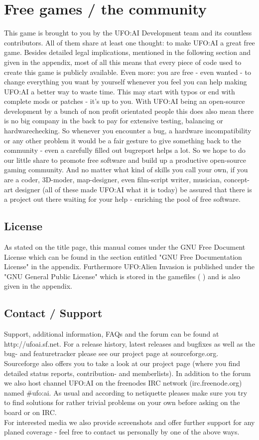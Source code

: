 \section{Free games / the community}
This game is brought to you by the UFO:AI Development team and its countless contributors. All of them share at least one thought: to make UFO:AI a great free %
 game. Besides detailed legal implications, mentioned in the following section and given in the appendix, most of all this means that every piece of code used to create this game is publicly available. Even more: you are free - even wanted - to change everything you want by yourself whenever you feel you can help making UFO:AI a better way to waste time. This may start with typos or end with complete mods or patches - it's up to you. With UFO:AI being an open-source development by a bunch of non profit orientated people this does also mean there is no big company in the back to pay for extensive testing, balancing or hardwarechecking. So whenever you encounter a bug, a hardware incompatibility or any other problem it would be a fair gesture to give something back to the community - even a carefully filled out bugreport helps a lot. So we hope to do our little share to promote free software and build up a productive open-source gaming community. And no matter what kind of skills you call your own, if you are a coder, 3D-moder, map-designer, even film-script writer, musician, concept-art designer (all of these made UFO:AI what it is today) be assured that there is a project out there waiting for your help - enriching the pool of free software.

\subsection{License}
As stated on the title page, this manual comes under the GNU Free Document License which can be found  in the section entitled "GNU Free Documentation License" in the appendix.
Furthermore UFO:Alien Invasion is published under the "GNU General Public License" which is stored in the gamefiles ( ) and is also given in the appendix.

\subsection{Contact / Support}
Support, additional information, FAQs and the forum can be found at http://ufoai.sf.net. %
For a release history, latest releases and bugfixes as well as the bug- and featuretracker please see our project page at sourceforge.org. %
Sourceforge also offers you to take a look at our project page (where you find detailed status reports, contribution- and memberlists). In addition to the forum we also host channel UFO:AI on the freenodes IRC network (irc.freenode.org) named #ufo:ai. As usual and according to netiquette pleases make sure you try to find solutions for rather trivial problems on your own before asking on the board or on IRC.\\
For interested media we also provide screenshots and offer further support for any planed coverage - feel free to contact us personally by one of the above ways.

